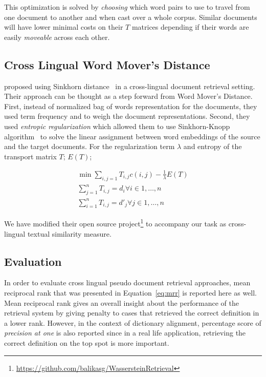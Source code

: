 This optimization is solved by \emph{choosing} which word pairs to use to travel from one document to another and when cast over a whole corpus.
Similar documents will have lower minimal costs on their $T$ matrices depending if their words are easily \emph{moveable} across each other.

\subsection{Cross Lingual Word Mover's Distance}%
\label{sub:clemd}

\textcite{balikasCrosslingual2018} proposed using Sinkhorn distance~\cite{cuturiSinkhorn2013} in a cross-lingual document retrieval setting.
Their approach can be thought as a step forward from Word Mover's Distance.
First, instead of normalized bag of words representation for the documents, they used term frequency and \tfidf{} to weigh the document representations.
Second, they used \emph{entropic regularization} which allowed them to use Sinkhorn-Knopp algorithm~\cite{sinkhornConcerning1967} to solve the linear assignment between word embeddings of the source and the target documents.
For the regularization term $\lambda$ and entropy of the transport matrix $T$; $E(T)$;

\begin{gather}
    \min \sum_{i,j = 1} T_{i,j} c(i,j) - \frac{1}{\lambda} E(T) \\
    \sum_{j=1}^{n}T_{i,j} = d_i \forall i \in {1, \dots, n} \\
    \sum_{i=1}^{n}T_{i,j} = d'_j \forall j \in {1, \dots, n}
\end{gather}

We have modified their open source project\footnote{\url{https://github.com/balikasg/WassersteinRetrieval}} to accompany our task as cross-lingual textual similarity measure.

\subsection{Evaluation}%
\label{sub:cldr_evaluation}

In order to evaluate cross lingual pseudo document retrieval approaches, mean reciprocal rank that was presented in Equation~\ref{eq:mrr} is reported here as well.
Mean reciprocal rank gives an overall insight about the performance of the retrieval system by giving penalty to cases that retrieved the correct definition in a lower rank.
However, in the context of dictionary alignment, percentage score of \emph{precision at one} is also reported since in a real life application, retrieving the correct definition on the top spot is more important.
